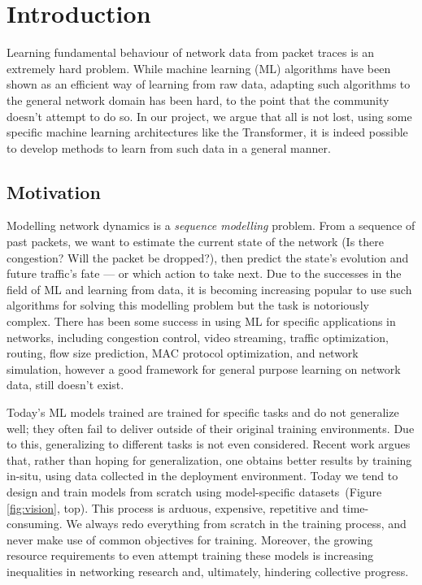 \chapter{Introduction}
\label{cha:introduction}

Learning fundamental behaviour of network data from packet traces is an extremely hard problem. While machine learning (ML) algorithms have been shown as an efficient way of learning from raw data, adapting such algorithms to the general network domain has been hard, to the point that the community doesn't attempt to do so. In our project, we argue that all is not lost, using some specific machine learning architectures like the Transformer, it is indeed possible to develop methods to learn from such data in a general manner.

\section{Motivation}
\label{sec:motivation}

Modelling network dynamics is a \emph{sequence modelling} problem. From a sequence of past packets, we want to estimate the current state of the network (\eg Is there congestion? Will the packet be dropped?), then predict the state's evolution and future traffic's fate --- or which action to take next. Due to the successes in the field of ML and learning from data, it is becoming increasing popular to use such algorithms for solving this modelling problem but the task is notoriously complex. There has been some success in using ML for specific applications in networks, including congestion control\cite{classic,jayDeepReinforcementLearning2019,dynamic,exmachina},
video streaming\cite{oboe,maoNeuralAdaptiveVideo2017,puffer},
traffic optimization\cite{auto},
routing\cite{learnroute},
flow size prediction\cite{flow,onlineflow},
MAC protocol optimization\cite{oneproto,heterowire},
and network simulation\cite{zhangMimicNetFastPerformance2021}, however a good framework for general purpose learning on network data, still doesn't exist.

Today's ML models trained are trained for specific tasks and do not generalize well; \ie they often fail to deliver outside of their original training environments\cite{puffer, datadriven, blackbox}. Due to this, generalizing to different tasks is not even considered. Recent work argues that, rather than hoping for generalization, one obtains better results by training in-situ, \ie using data collected in the deployment environment\cite{puffer}.
Today we tend to design and train models from scratch using model-specific datasets~(Figure \ref{fig:vision}, top). This process is arduous, expensive, repetitive and time-consuming. We always redo everything from scratch in the training process, and never make use of common objectives for training. Moreover, the growing resource requirements to even attempt training these models is increasing inequalities in networking research and, ultimately, hindering collective progress.

